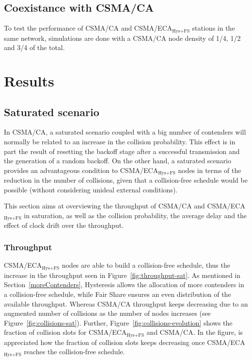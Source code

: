 \documentclass[a4paper,journal]{IEEEtran}
\begin{document}
	\subsection{Coexistance with CSMA/CA}
	To test the performance of CSMA/CA and CSMA/ECA$_{\text{Hys+FS}}$ stations in the same network, simulations are done with a CSMA/CA node density of 1/4, 1/2 and 3/4 of the total.
	

\section{Results}\label{results}

	\subsection{Saturated scenario}\label{resultsSaturated}
	In CSMA/CA, a saturated scenario coupled with a big number of contenders will normally be related to an increase in the collision probability. This effect is in part the result of resetting the backoff stage after a successful transmission and the generation of a random backoff. On the other hand, a saturated scenario provides an advantageous condition to CSMA/ECA$_{\text{Hys+FS}}$ nodes in terms of the reduction in the number of collisions, given that a collision-free schedule would be possible (without considering unideal external conditions).
	
	This section aims at overviewing the throughput of CSMA/CA and CSMA/ECA$_{\text{Hys+FS}}$  in saturation, as well as the collision probability, the average delay and the effect of clock drift over the throughput.
	\\
	\subsubsection{Throughput}
	CSMA/ECA$_{\text{Hys+FS}}$ nodes are able to build a collision-free schedule, thus the increase in the throughput seen in Figure~\ref{fig:throughput-sat}. As mentioned in Section~\ref{moreContenders}, Hysteresis allows the allocation of more contenders in a collision-free schedule, while Fair Share ensures an even distribution of the available throughput. Whereas CSMA/CA throughput keeps decreasing due to an augmented number of collisions as the number of nodes increases (see Figure~\ref{fig:collisions-sat}). Further, Figure~\ref{fig:collisions-evolution} shows the fraction of collision slots for CSMA/ECA$_{\text{Hys+FS}}$ and CSMA/CA. In the figure, is appreciated how the fraction of collision slots keeps decreasing once CSMA/ECA$_{\text{Hys+FS}}$ reaches the collision-free schedule.
	
\end{document}
